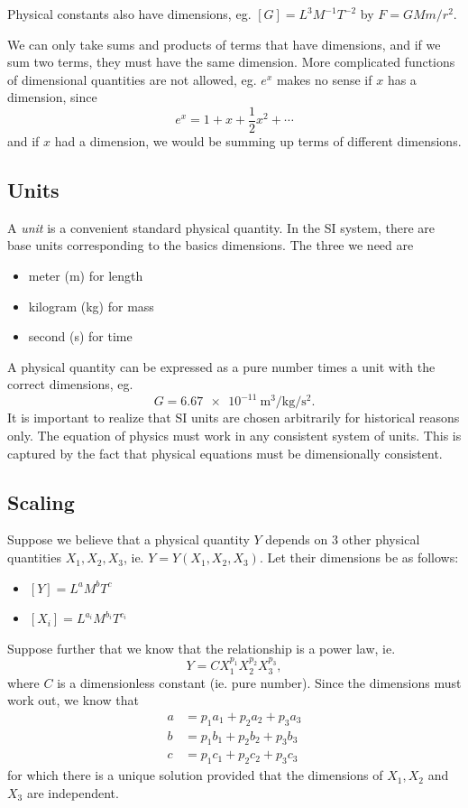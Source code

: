 \documentclass[a4paper]{article}
\begin{document}
Physical constants also have dimensions, eg. $[G] = L^3M^{-1}T^{-2}$ by $F = GMm/r^2$.

We can only take sums and products of terms that have dimensions, and if we sum two terms, they must have the same dimension. More complicated functions of dimensional quantities are not allowed, eg. $e^{x}$ makes no sense if $x$ has a dimension, since
\[
  e^x = 1 + x + \frac{1}{2}x^2 + \cdots
\]
and if $x$ had a dimension, we would be summing up terms of different dimensions.
\subsection{Units}
A \emph{unit} is a convenient standard physical quantity. In the SI system, there are base units corresponding to the basics dimensions. The three we need are 
\begin{itemize}
  \item meter (m) for length
  \item kilogram (kg) for mass
  \item second (s) for time
\end{itemize}
A physical quantity can be expressed as a pure number times a unit with the correct dimensions, eg.
\[
  G = \SI{6.67e-11}{\meter\cubed\per\kilogram\per\second\squared}.
\]
It is important to realize that SI units are chosen arbitrarily for historical reasons only. The equation of physics must work in any consistent system of units. This is captured by the fact that physical equations must be dimensionally consistent.

\subsection{Scaling}
Suppose we believe that a physical quantity $Y$ depends on $3$ other physical quantities $X_1, X_2, X_3$, ie. $Y = Y(X_1, X_2, X_3)$. Let their dimensions be as follows:
\begin{itemize}
  \item $[Y] = L^aM^bT^c$
  \item $[X_i] = L^{a_i}M^{b_i}T^{c_i}$
\end{itemize}
Suppose further that we know that the relationship is a power law, ie. 
\[
  Y = CX_1^{p_1}X_2^{p_2}X_3^{p_3},
\]
where $C$ is a dimensionless constant (ie. pure number). Since the dimensions must work out, we know that
\begin{align*}
  a &= p_1a_1 + p_2a_2 + p_3a_3\\
  b &= p_1b_1 + p_2b_2 + p_3b_3\\
  c &= p_1c_1 + p_2c_2 + p_3c_3
\end{align*}
for which there is a unique solution provided that the dimensions of $X_1, X_2$ and $X_3$ are independent.
\end{document}
